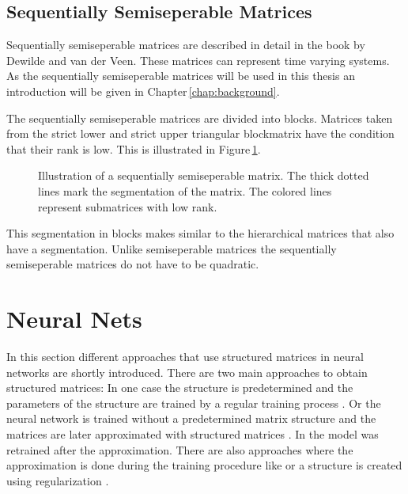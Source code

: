 \documentclass[doctype=mastersthesis,BCOR=15mm,biblatex]{ldvbook}%
\begin{document}
\subsection{Sequentially Semiseperable Matrices}
Sequentially semiseperable matrices are described in detail in the book by Dewilde and van der Veen\cite{dewilde_time-varying_1998}.
These matrices can represent time varying systems.
As the sequentially semiseperable matrices will be used in this thesis an introduction will be given in Chapter\,\ref{chap:background}. 

The sequentially semiseperable matrices are divided into blocks.
Matrices taken from the strict lower and strict upper triangular blockmatrix have the condition that their rank is low.
This is illustrated in Figure\,\ref{fig:sequentiallysep}.

\begin{figure}[htb]
	\centering
	
	\caption{Illustration of a sequentially semiseperable matrix. The thick dotted lines mark the segmentation of the matrix. The colored lines represent submatrices with low rank.}
	\label{fig:sequentiallysep}
\end{figure}

This segmentation in blocks makes similar to the hierarchical matrices that also have a segmentation.
Unlike semiseperable matrices the sequentially semiseperable matrices do not have to be quadratic. 

\section{Neural Nets}\label{sec:AI_weight}
In this section different approaches that use structured matrices in neural networks are shortly introduced.
There are two main approaches to obtain structured matrices:
In one case the structure is predetermined and the parameters of the structure are trained by a regular training process \cite{fan_multiscale_2019,dao_kaleidoscope_2020,li_butterfly_2015,ailon_sparse_2021,ioannou_training_2016}.
Or the neural network is trained without a predetermined matrix structure and the matrices are later approximated with structured matrices \cite{wu_hybrid_2020,hassibi_optimal_1993,jaderberg_speeding_2014,rigamonti_learning_2013}. In \cite{yu_compressing_2017} the model was retrained after the approximation. 
There are also approaches where the approximation is done during the training procedure like \cite{dettmers_sparse_2019} or a structure is created using regularization \cite{louizos_learning_2018,wen_learning_2016}.
\end{document}
